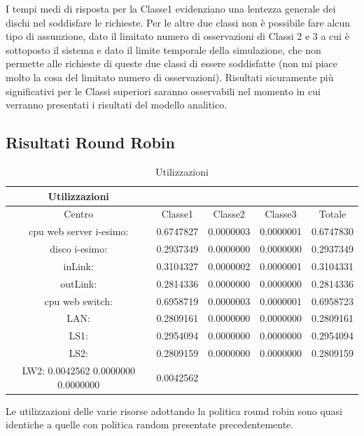 I tempi medi di risposta per la Classe1 evidenziano una lentezza generale dei dischi nel soddisfare le richieste. Per le altre due classi non è possibile fare alcun tipo di assunzione, dato il limitato numero di osservazioni di Classi 2 e 3 a cui è sottoposto il sistema e dato il limite temporale della simulazione, che non permette alle richieste di queste due classi di essere soddisfatte (non mi piace molto la cosa del limitato numero di osservazioni). Risultati sicuramente più significativi per le Classi superiori saranno osservabili nel momento in cui verranno presentati i risultati del modello analitico.

\subsection{Risultati Round Robin}
\begin{table}[htbp]
\begin{center}
\begin{tabular}{|c|c|c|c|c|}
\hline
Utilizzazioni\\
\hline
Centro &Classe1 &Classe2 &Classe3 &Totale\\
\hline
\hline
 cpu web server i-esimo: 	&0.6747827	&0.0000003	&0.0000001	&0.6747830\\
\hline
 disco i-esimo: 	&0.2937349	&0.0000000	&0.0000000	&0.2937349\\
\hline
 inLink: 	&0.3104327	&0.0000002	&0.0000001	&0.3104331\\
\hline
 outLink: 	&0.2814336	&0.0000000	&0.0000000	&0.2814336\\
\hline
 cpu web switch: 	&0.6958719	&0.0000003	&0.0000001	&0.6958723\\
\hline
 LAN: 	&0.2809161	&0.0000000	&0.0000000	&0.2809161\\
\hline
 LS1: 	&0.2954094	&0.0000000	&0.0000000	&0.2954094\\
\hline
 LS2:	&0.2809159	&0.0000000	&0.0000000	&0.2809159\\
\hline
 LW2: 	0.0042562	0.0000000	0.0000000	&0.0042562\\
\hline
\end{tabular}
\end{center}
\caption{Utilizzazioni}
\label{utilizzazioni}
\end{table}
Le utilizzazioni delle varie risorse adottando la politica round robin sono quasi identiche a quelle con politica random presentate precedentemente.
